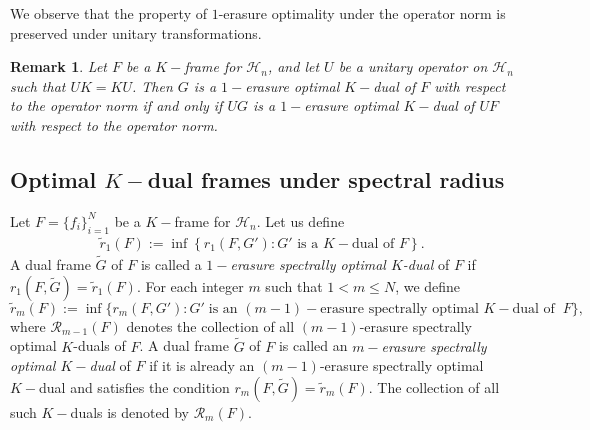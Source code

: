 \documentclass[final,1p,times]{elsarticle}
\newtheorem{rem}[thm]{Remark}
\begin{document}
	\noindent We observe that the property of $1$-erasure optimality under the operator norm is preserved under unitary transformations.

\begin{rem}\label{thm4point3}
Let \( F \) be a \( K -\)frame for \( \mathcal{H}_n \), and let \( U \) be a unitary operator on \( \mathcal{H}_n \) such that \( UK = KU \). Then  \( G \) is a $1-$erasure optimal \( K-\)dual of \( F \) with respect to the operator norm if and only if \( UG \) is a $1-$erasure optimal \( K-\)dual of \( UF \) with respect to the operator norm.
\end{rem}



	
	
	
	\subsection{Optimal $K-$dual frames under spectral radius}
    \vspace{.2 cm}
	Let \( F = \{f_i\}_{i=1}^N \) be a \( K -\)frame for \( \mathcal{H}_n \). Let us define
\begin{align*}
	\tilde{r}_1(F) := \inf \left\{ r_1(F, G') : G' \text{ is a } K-\text{dual of } F \right\}.
\end{align*}
A dual frame \( \tilde{G} \) of \( F \) is called a \textit{$1-$erasure spectrally optimal \( K \)-dual} of \( F \) if $r_1(F, \tilde{G}) = \tilde{r}_1(F).$ For each integer \( m \) such that \( 1 < m \leq N \), we define 
\[
\tilde{r}_{m} (F) := \inf \bigg\{ r_{m} (F,G') : G' \;\text{is an } (m-1)-\text{erasure} \text{ spectrally optimal $K-$dual of}\;\; F \bigg\},
\]
where \( \mathcal{R}_{m-1}(F) \) denotes the collection of all \((m-1)\)-erasure spectrally optimal \( K \)-duals of \( F \). A dual frame \( \tilde{G} \) of \( F \) is called an \textit{\( m-\)erasure spectrally optimal \( K-\)dual} of \( F \) if it is already an \((m{-}1)\)-erasure spectrally optimal \( K-\)dual and satisfies the condition \( r_m(F, \tilde{G}) = \tilde{r}_m(F) \). The collection of all such \( K-\)duals is denoted by \( \mathcal{R}_m(F) \).
\end{document}
